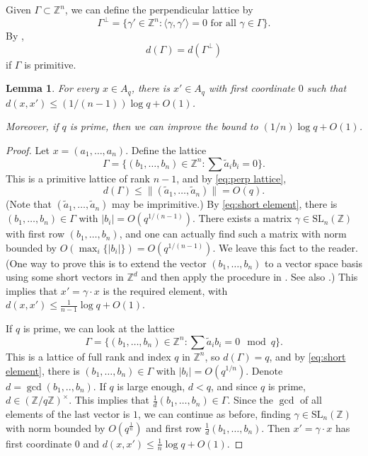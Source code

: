 \documentclass[12pt, a4paper]{amsart}
\numberwithin{equation}{section}
\newtheorem{lemma}[theorem]{Lemma}
\theoremstyle{definition}
\newcommand{\Z}{\mathbb{Z}}
\newcommand{\SL}{\mathrm{SL}}
\newcommand{\wt}{\widetilde}
\begin{document}
Given $\Gamma\subset\Z^n$, we can define the perpendicular lattice by
\[
\Gamma^\perp = \{\gamma'\in \Z^n :  \langle \gamma, \gamma'\rangle = 0\text{ for all $\gamma \in \Gamma$}\}.
\]
By \cite[Corollary of Lemma~1]{schmidt1968asymptotic}, 
\begin{equation}\label{eq:perp lattice}
	d(\Gamma)=d(\Gamma^\perp)
\end{equation}
if $\Gamma$ is primitive.

\begin{lemma}
    For every $x\in A_q$, there is $x'\in A_q$ with first coordinate $0$ such that $d(x,x')\le (1/(n-1))\log q+O(1)$.
    
    Moreover, if $q$ is prime, then we can improve the bound to  $(1/n)\log q+O(1)$.
\end{lemma}
\begin{proof}
    Let $x =(a_1,\ldots,a_n)$. Define the lattice
    \[
    \Gamma = \{(b_1,\ldots,b_n)\in \Z^n : \sum \wt a_i b_i =0\}.
    \]
    This is a primitive lattice of rank $n-1$, and by \cref{eq:perp lattice},
    \[
    d(\Gamma)\le \|(\wt a_1,\ldots,\wt a_n)\| = O(q).
    \]
    (Note that $(\wt a_1,\ldots, \wt a_n)$ may be imprimitive.)
    By \cref{eq:short element}, there is $(b_1,\ldots,b_n)\in \Gamma$ with $|b_i| =O(q^{1/(n-1)})$. There exists a matrix $\gamma \in \SL_n(\Z)$ with first row $(b_1,\ldots,b_n)$, and one can actually find such a matrix with norm bounded by $O(\max_i \{|b_i|\})= O(q^{1/(n-1)})$. We leave this fact to the reader. (One way to prove this is to extend the vector $(b_1,\ldots,b_n)$ to a vector space basis using some short vectors in $\Z^d$ and then apply the procedure in \cite[Lecture V \S 2]{siegel1989lectures}. See also \cite[Lecture X \S 4]{siegel1989lectures}.) This implies that $x' = \gamma \cdot x$ is the required element, with $d(x,x') \le \frac{1}{n-1}\log q +O(1)$. 

    If $q$ is prime, we can look at the lattice
    \[
    \Gamma = \{(b_1,\ldots,b_n)\in \Z^n : \sum \wt a_i b_i =0 \mod q\}. 
    \]
    This is a lattice of full rank and index $q$ in  $\Z^n$, so $d(\Gamma)=q$, and by \cref{eq:short element}, there is $(b_1,\ldots,b_n)\in \Gamma$ with $|b_i| =O(q^{1/n})$. Denote $d=\gcd(b_1,..,b_n)$. If $q$ is large enough, $d<q$, and since $q$ is prime, $d\in (\Z/q\Z)^\times$. This implies that $\frac{1}{d}(b_1,\ldots,b_n) \in \Gamma$. Since the $\gcd$ of all elements of the last vector is $1$, we can continue as before, finding $\gamma \in \SL_n(\Z)$ with norm bounded by $O(q^{\frac{1}{n}})$ and first row  $\frac{1}{d}(b_1,\ldots,b_n)$. Then $x'=\gamma \cdot x$ has first coordinate $0$ and $d(x,x')\le \frac{1}{n}\log q + O(1)$.
\end{proof}
\end{document}
